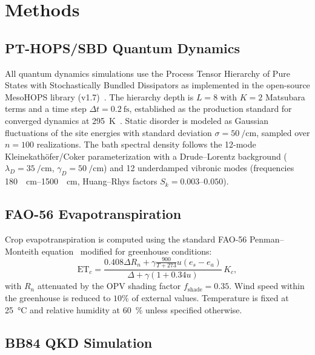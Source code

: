 \documentclass[twocolumn]{article}
\begin{document}

\section*{Methods}

\subsection*{PT-HOPS/SBD Quantum Dynamics}

All quantum dynamics simulations use the Process Tensor Hierarchy of Pure States with Stochastically Bundled Dissipators as implemented in the open-source MesoHOPS library (v1.7)~\cite{Varvelo2021}.
The hierarchy depth is $L = 8$ with $K = 2$ Matsubara terms and a time step $\Delta t = \SI{0.2}{\fs}$, established as the production standard for converged dynamics at \SI{295}{\kelvin}~\cite{Kouam2026}.
Static disorder is modeled as Gaussian fluctuations of the site energies with standard deviation $\sigma = \SI{50}{\per\cm}$, sampled over $n = 100$ realizations.
The bath spectral density follows the 12-mode Kleinekath\"{o}fer/Coker parameterization with a Drude--Lorentz background ($\lambda_D = \SI{35}{\per\cm}$, $\gamma_D = \SI{50}{\per\cm}$) and 12 underdamped vibronic modes (frequencies \SIrange{180}{1500}{\per\cm}, Huang--Rhys factors $S_k = \numrange{0.003}{0.050}$).

\subsection*{FAO-56 Evapotranspiration}

Crop evapotranspiration is computed using the standard FAO-56 Penman--Monteith equation~\cite{Allen1998} modified for greenhouse conditions:
\begin{equation}
\mathrm{ET}_c = \frac{0.408 \Delta R_n + \gamma \frac{900}{T+273} u (e_s - e_a)}{\Delta + \gamma(1 + 0.34 u)} \, K_c,
\end{equation}
with $R_n$ attenuated by the OPV shading factor $f_{\mathrm{shade}} = 0.35$.
Wind speed within the greenhouse is reduced to $10\%$ of external values.
Temperature is fixed at \SI{25}{\celsius} and relative humidity at \SI{60}{\percent} unless specified otherwise.

\subsection*{BB84 QKD Simulation}
\end{document}

